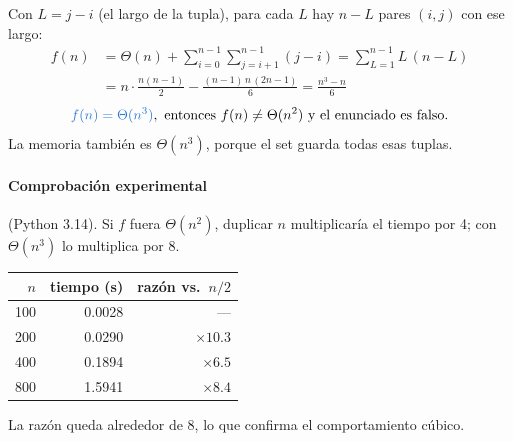 \documentclass[11pt]{article}
\newcommand{\res}[1]{\textcolor{azul}{\textbf{#1}}}
\begin{document}
Con $L = j - i$ (el largo de la tupla), para cada $L$ hay $n - L$ pares $(i, j)$ con ese
largo:
\begin{align*}
  f(n) &= \Theta(n) + \sum_{i=0}^{n-1}\sum_{j=i+1}^{n-1}(j - i)
        = \sum_{L=1}^{n-1} L\,(n - L) \\
       &= n\cdot\frac{n(n-1)}{2} - \frac{(n-1)\,n\,(2n-1)}{6}
        = \frac{n^3 - n}{6}
\end{align*}
\[
  \res{$f(n) = \Theta(n^3)$}, \text{ entonces } f(n) \ne \Theta(n^2) \text{ y el enunciado es falso.}
\]
La memoria también es $\Theta(n^3)$, porque el set guarda todas esas tuplas.

\paragraph{Comprobación experimental} (Python 3.14). Si $f$ fuera $\Theta(n^2)$, duplicar $n$
multiplicaría el tiempo por 4; con $\Theta(n^3)$ lo multiplica por 8.

\begin{center}
\begin{tabular}{rrr}
  \toprule
  $n$ & tiempo (s) & razón vs.\ $n/2$ \\
  \midrule
  100 & 0.0028 & --- \\
  200 & 0.0290 & $\times 10.3$ \\
  400 & 0.1894 & $\times 6.5$ \\
  800 & 1.5941 & $\times 8.4$ \\
  \bottomrule
\end{tabular}
\end{center}
La razón queda alrededor de 8, lo que confirma el comportamiento cúbico.
\end{document}
